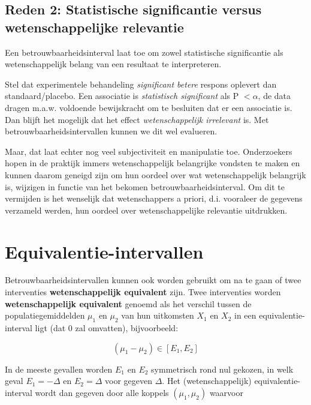 \documentclass[
  12pt,dutch,coursenotes]{book}
\theoremstyle{definition}
\theoremstyle{definition}
\theoremstyle{definition}
\theoremstyle{definition}
\theoremstyle{remark}
\begin{document}
\hypertarget{reden-2-statistische-significantie-versus-wetenschappelijke-relevantie}{%
\subsection{Reden 2: Statistische significantie versus wetenschappelijke relevantie}\label{reden-2-statistische-significantie-versus-wetenschappelijke-relevantie}}

Een betrouwbaarheidsinterval laat toe om zowel statistische significantie als wetenschappelijk belang van een resultaat te interpreteren.

Stel dat experimentele behandeling \emph{significant betere} respons oplevert dan standaard/placebo.
Een associatie is \emph{statistisch significant} als P \(< \alpha\),
de data dragen m.a.w. voldoende bewijskracht om te besluiten dat er een associatie is. Dan blijft het mogelijk dat het effect \emph{wetenschappelijk irrelevant} is.
Met betrouwbaarheidsintervallen kunnen we dit wel evalueren.

Maar, dat laat echter nog veel subjectiviteit en manipulatie toe. Onderzoekers hopen in de praktijk immers wetenschappelijk belangrijke vondsten te maken en kunnen daarom geneigd zijn om hun oordeel over wat wetenschappelijk belangrijk is, wijzigen in functie van het bekomen betrouwbaarheidsinterval. Om dit te vermijden is het wenselijk dat wetenschappers a priori, d.i. vooraleer de gegevens verzameld werden, hun oordeel over wetenschappelijke relevantie uitdrukken.

\hypertarget{equivalentie-intervallen}{%
\section{Equivalentie-intervallen}\label{equivalentie-intervallen}}

Betrouwbaarheidsintervallen kunnen ook worden gebruikt om na te gaan of twee interventies \textbf{wetenschappelijk equivalent} zijn.
Twee interventies worden \textbf{wetenschappelijk equivalent} genoemd als het verschil tussen de populatiegemiddelden
\(\mu_1\) en \(\mu_2\) van hun uitkomsten \(X_1\) en \(X_2\) in een
equivalentie-interval ligt (dat 0 zal omvatten), bijvoorbeeld:

\begin{equation*}
(\mu_1 - \mu_2) \in [E_1, E_2]
\end{equation*}

In de meeste gevallen worden \(E_1\) en \(E_2\) symmetrisch rond nul gekozen, in
welk geval \(E_1=-\Delta\) en \(E_2=\Delta\) voor gegeven \(\Delta\). Het
(wetenschappelijk) equivalentie-interval wordt dan gegeven door alle koppels \((\mu_1,\mu_2)\) waarvoor
\end{document}

